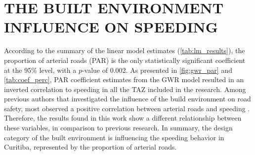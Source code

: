 \section{THE BUILT ENVIRONMENT INFLUENCE ON SPEEDING} \label{sec:be_sp}




According to the summary of the linear model estimates (\autoref{tab:lm_results}), the proportion of arterial roads (PAR) is the only statistically significant coefficient at the 95\% level, with a $p$-value of 0.002. As presented in \autoref{fig:gwr_par} and \autoref{tab:coef_perc}, PAR coefficient estimates from the GWR model resulted in an inverted correlation to speeding in all the TAZ included in the research. Among previous authors that investigated the influence of the build environment on road safety, most observed a positive correlation between arterial roads and speeding \cite{Dumbaugh2011,Ewing2009, Huang2018,Obelheiro2020}. Therefore, the results found in this work show a different relationship between these variables, in comparison to previous research. In summary, the design category of the built environment is influencing the speeding behavior in Curitiba, represented by the proportion of arterial roads. 



